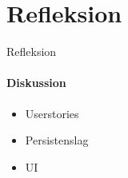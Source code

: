 \section{Refleksion}

\begin{frame}{Refleksion}
\framesubtitle{Diskussion}
\begin{itemize}
\item Userstories
\item Persistenslag
\item UI
\end{itemize}
\end{frame}


